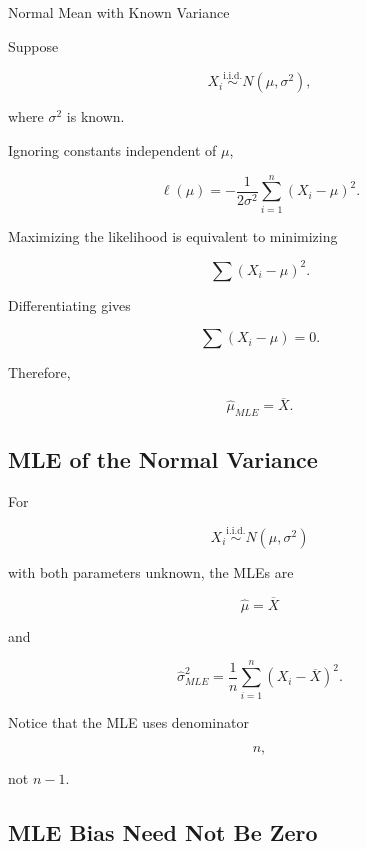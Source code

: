 \begin{workedexamplebox}{Normal Mean with Known Variance}

Suppose

\[
X_i
\overset{\text{i.i.d.}}{\sim}
N(\mu,\sigma^2),
\]

where \(\sigma^2\) is known.

Ignoring constants independent of \(\mu\),

\[
\ell(\mu)
=
-
\frac1{2\sigma^2}
\sum_{i=1}^{n}
(X_i-\mu)^2.
\]

Maximizing the likelihood is equivalent to minimizing

\[
\sum
(X_i-\mu)^2.
\]

Differentiating gives

\[
\sum
(X_i-\mu)=0.
\]

Therefore,

\begin{answerbox}
\[
\boxed{
\widehat{\mu}_{MLE}
=
\overline{X}.
}
\]
\end{answerbox}

\end{workedexamplebox}

\subsection{MLE of the Normal Variance}
\label{subsec:normal-variance-mle}

For

\[
X_i
\overset{\text{i.i.d.}}{\sim}
N(\mu,\sigma^2)
\]

with both parameters unknown, the MLEs are

\[
\boxed{
\widehat{\mu}
=
\overline{X}
}
\]

and

\[
\boxed{
\widehat{\sigma}^2_{MLE}
=
\frac1n
\sum_{i=1}^{n}
(
X_i-\overline{X}
)^2.
}
\]

Notice that the MLE uses denominator

\[
n,
\]

not \(n-1\).

\subsection{MLE Bias Need Not Be Zero}
\label{subsec:mle-bias}

